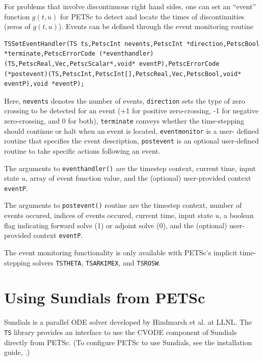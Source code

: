 For problems that involve discontinuous right hand sides, one can set an ``event'' function
$ g(t,u) $ for PETSc to detect and locate the times of discontinuities (zeros of $g(t,u)$). Events can be defined through the
event monitoring routine
\begin{lstlisting}
TSSetEventHandler(TS ts,PetscInt nevents,PetscInt *direction,PetscBool *terminate,PetscErrorCode (*eventhandler)(TS,PetscReal,Vec,PetscScalar*,void* eventP),PetscErrorCode (*postevent)(TS,PetscInt,PetscInt[],PetscReal,Vec,PetscBool,void* eventP),void *eventP);
\end{lstlisting}
Here, \lstinline{nevents} denotes the number of events, \lstinline{direction} sets the type of zero crossing to be detected for
an event (+1 for positive zero-crossing, -1 for negative zero-crossing, and 0 for both), \lstinline{terminate} conveys whether
the time-stepping should continue or halt when an event is located, \lstinline{eventmonitor} is a user-
defined routine that specifies the event description, \lstinline{postevent} is an optional user-defined routine to take
specific actions following an event.

The arguments to \lstinline{eventhandler()} are the timestep context, current time, input state $u$, array of event function
value, and the (optional) user-provided context \lstinline{eventP}.

The arguments to \lstinline{postevent()} routine are
the timestep context, number of events occured, indices of events occured, current time, input state $u$, a boolean flag indicating forward solve (1) or adjoint solve (0), and the (optional)
user-provided context \lstinline{eventP}.

The event monitoring functionality is only available with PETSc's implicit time-stepping solvers \lstinline{TSTHETA}, \lstinline{TSARKIMEX}, and \lstinline{TSROSW}.


\section{Using Sundials from PETSc}
\label{sec_sundials}

Sundials is a parallel ODE solver developed by Hindmarsh et al. at LLNL.
The \lstinline{TS} library provides an interface to use the CVODE component of
Sundials directly from PETSc.  (To configure PETSc to use Sundials, see
the installation guide, .)

